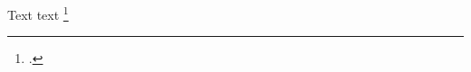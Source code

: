 \documentclass{beamer}
\begin{document}
 \begin{frame}
    Text text \footcite{RePEc:cwl:cwldpp:159}
 \end{frame}

 \begin{frame}
     \printbibliography
 \end{frame} 
\end{document}
